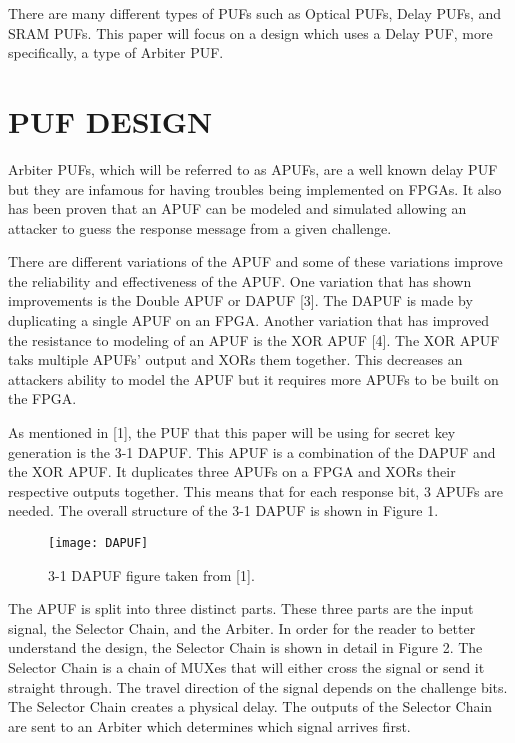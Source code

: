 \documentclass[letterpaper, 10 pt, conference]{ieeeconf}  %
\begin{document}
There are many different types of PUFs such as Optical PUFs, Delay PUFs, and SRAM PUFs.  This paper will focus on a design which uses a Delay PUF, more specifically, a type of Arbiter PUF.

\section{PUF DESIGN}

Arbiter PUFs, which will be referred to as APUFs, are a well known delay PUF but they are infamous for having troubles being implemented on FPGAs.  It also has been proven that an APUF can be modeled and simulated allowing an attacker to guess the response message from a given challenge.

There are different variations of the APUF and some of these variations improve the reliability and effectiveness of the APUF.  One variation that has shown improvements is the Double APUF or DAPUF [3].  The DAPUF is made by duplicating a single APUF on an FPGA.  Another variation that has improved the resistance to modeling of an APUF is the XOR APUF [4].  The XOR APUF taks multiple APUFs' output and XORs them together.  This decreases an attackers ability to model the APUF but it requires more APUFs to be built on the FPGA.

As mentioned in [1], the PUF that this paper will be using for secret key generation is the 3-1 DAPUF.  This APUF is a combination of the DAPUF and the XOR APUF.  It duplicates three APUFs on a FPGA and XORs their respective outputs together.  This means that for each response bit, 3 APUFs are needed.  The overall structure of the 3-1 DAPUF is shown in Figure 1.

\begin{figure}[thpb]
	\centering
	\texttt{[image: DAPUF]}
   \caption{3-1 DAPUF figure taken from [1].}
\end{figure}

The APUF is split into three distinct parts.  These three parts are the input signal, the Selector Chain, and the Arbiter.  In order for the reader to better understand the design, the Selector Chain is shown in detail in Figure 2.  The Selector Chain is a chain of MUXes that will either cross the signal or send it straight through.  The travel direction of the signal depends on the challenge bits.  The Selector Chain creates a physical delay.  The outputs of the Selector Chain are sent to an Arbiter which determines which signal arrives first.
\end{document}
